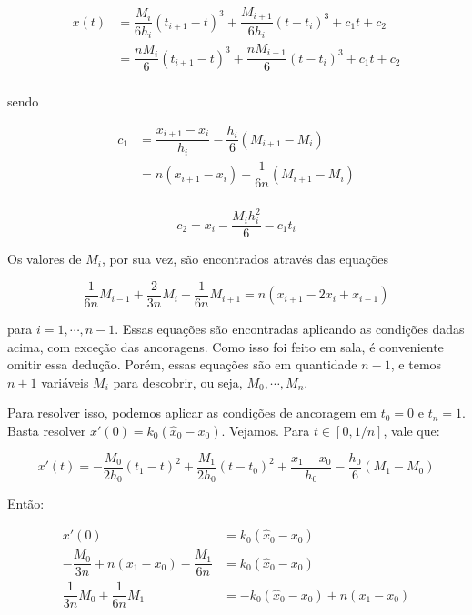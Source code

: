 \documentclass{article}
\begin{document}
\begin{enumerate}
\begin{enumerate}
                    \begin{align*}
                        x(t) &= \dfrac{M_i}{6h_i}(t_{i+1}-t)^3 + \dfrac{M_{i+1}}{6h_i}(t-t_i)^3 + c_1t+c_2 \\
                        &= \dfrac{nM_i}{6}(t_{i+1}-t)^3 + \dfrac{nM_{i+1}}{6}(t-t_i)^3 + c_1t+c_2 \\
                    \end{align*}

                    sendo

                    \begin{align*}
                        c_1 &= \dfrac{x_{i+1}-x_i}{h_i} -\dfrac{h_i}{6}(M_{i+1}-M_i) \\
                        &= n(x_{i+1}-x_i) -\dfrac{1}{6n}(M_{i+1}-M_i) \\
                    \end{align*}

                    $$c_2 = x_i - \dfrac{M_i h_i^2}{6} - c_1 t_i$$
                    
                    Os valores de $M_i$, por sua vez, são encontrados através das equações

                    $$\dfrac{1}{6n}M_{i-1} + \dfrac{2}{3n}M_i + \dfrac{1}{6n}M_{i+1} = n(x_{i+1} - 2x_i + x_{i-1})$$

                    para $i = 1, \cdots, n-1$. Essas equações são encontradas aplicando as condições
                    dadas acima, com exceção das ancoragens. Como isso foi feito em sala,
                    é conveniente omitir essa dedução. Porém, essas equações são em quantidade
                    $n-1$, e temos $n+1$ variáveis $M_i$ para descobrir, ou seja, $M_0, \cdots, M_n$.

                    Para resolver isso, podemos aplicar as condições de ancoragem em $t_0 = 0$ e $t_n = 1$.
                    Basta resolver $x'(0) = k_0(\hat{x}_0 - x_0)$. Vejamos. Para $t \in [0, 1/n]$, vale que:

                    $$x'(t) = -\dfrac{M_0}{2h_0}(t_1 - t)^2 + \dfrac{M_1}{2h_0}(t-t_0)^2 + \dfrac{x_1 - x_0}{h_0} - \dfrac{h_0}{6}(M_1 - M_0)$$

                    Então:

                    \begin{align*}
                        x'(0) &= k_0(\hat{x}_0 - x_0) \\
                        -\dfrac{M_0}{3n} + n(x_1 - x_0) - \dfrac{M_1}{6n} &= k_0(\hat{x}_0 - x_0) \\
                        \dfrac{1}{3n}M_0 + \dfrac{1}{6n}M_1 &= -k_0(\hat{x}_0 - x_0) + n(x_1 - x_0) \\
                    \end{align*}


\end{enumerate}
\end{enumerate}
\end{document}
